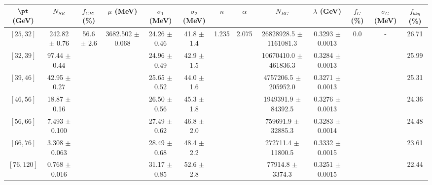\begin{tabular}{c||c|c|c|c|c|c|c|c|c|c|c||c}
$\pt$ (GeV) & $N_{SR}$ & $f_{CB1}$ (\%) & $\mu$ (MeV) & $\sigma_1$ (MeV) & $\sigma_2$ (MeV) & $n$ & $\alpha$ & $N_{BG}$ & $\lambda$ (GeV) & $f_G$ (\%) & $\sigma_G$ (MeV) & $f_{bkg}$ (\%) \\
\hline
$[25, 32]$ & 242.82 $\pm$ 0.76 & \multirow{7}{*}{56.6 $\pm$ 2.6} & \multirow{7}{*}{3682.502 $\pm$ 0.068} & 24.26 $\pm$ 0.46 & 41.8 $\pm$ 1.4 & \multirow{7}{*}{1.235} & \multirow{7}{*}{2.075} & 26828928.5 $\pm$ 1161081.3 & 0.3293 $\pm$ 0.0013 & \multirow{7}{*}{0.0} & \multirow{7}{*}{-} & 26.71\\
$[32, 39]$ & 97.44 $\pm$ 0.44 &  &  & 24.96 $\pm$ 0.49 & 42.9 $\pm$ 1.5 &  &  & 10670410.0 $\pm$ 461836.3 & 0.3284 $\pm$ 0.0013 &  &  & 25.99\\
$[39, 46]$ & 42.95 $\pm$ 0.27 &  &  & 25.65 $\pm$ 0.52 & 44.0 $\pm$ 1.6 &  &  & 4757206.5 $\pm$ 205952.0 & 0.3271 $\pm$ 0.0013 &  &  & 25.31\\
$[46, 56]$ & 18.87 $\pm$ 0.16 &  &  & 26.50 $\pm$ 0.56 & 45.3 $\pm$ 1.8 &  &  & 1949391.9 $\pm$ 84392.5 & 0.3276 $\pm$ 0.0013 &  &  & 24.36\\
$[56, 66]$ & 7.493 $\pm$ 0.100 &  &  & 27.49 $\pm$ 0.62 & 46.8 $\pm$ 2.0 &  &  & 759691.9 $\pm$ 32885.3 & 0.3283 $\pm$ 0.0014 &  &  & 24.48\\
$[66, 76]$ & 3.308 $\pm$ 0.063 &  &  & 28.49 $\pm$ 0.68 & 48.4 $\pm$ 2.2 &  &  & 272711.4 $\pm$ 11800.5 & 0.3332 $\pm$ 0.0015 &  &  & 23.61\\
$[76, 120]$ & 0.768 $\pm$ 0.016 &  &  & 31.17 $\pm$ 0.85 & 52.6 $\pm$ 2.8 &  &  & 77914.8 $\pm$ 3374.3 & 0.3251 $\pm$ 0.0015 &  &  & 22.44\\
\end{tabular}
